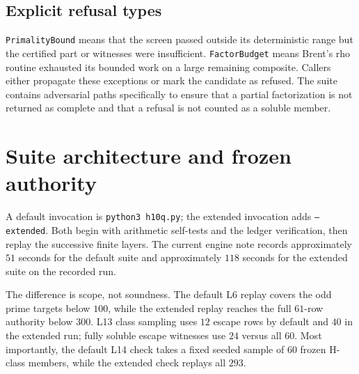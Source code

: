 \documentclass[11pt]{amsart}%
\begin{document}
\subsection{Explicit refusal types}
\texttt{PrimalityBound} means that the screen passed outside its deterministic
range but the certified part or witnesses were insufficient.
\texttt{FactorBudget} means Brent's rho routine exhausted its bounded work on a
large remaining composite.  Callers either propagate these exceptions or mark
the candidate as refused.  The suite contains adversarial paths specifically
to ensure that a partial factorization is not returned as complete and that a
refusal is not counted as a soluble member.

\section{Suite architecture and frozen authority}

A default invocation is \texttt{python3 h10q.py}; the extended invocation adds
\texttt{--extended}.  Both begin with arithmetic self-tests and the ledger
verification, then replay the successive finite layers.  The current engine
note records approximately \(51\) seconds for the default suite and
approximately \(118\) seconds for the extended suite on the recorded run.

The difference is scope, not soundness.  The default L6 replay covers the odd
prime targets below \(100\), while the extended replay reaches the full
\(61\)-row authority below \(300\).  L13 class sampling uses \(12\) escape
rows by default and \(40\) in the extended run; fully soluble escape witnesses
use \(24\) versus all \(60\).  Most importantly, the default L14 check takes a
fixed seeded sample of \(60\) frozen H-class members, while the extended check
replays all \(293\).
\end{document}
